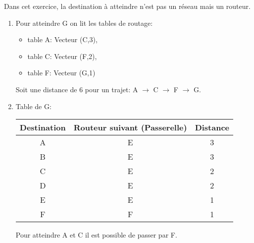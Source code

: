 \documentclass[a4paper,11pt]{article}
\begin{document}
\begin{exo}
    \begin{aretenir}[Remarque]
    Dans cet exercice, la destination à atteindre n'est pas un réseau mais un routeur.
    \end{aretenir}
\begin{enumerate}
    \item Pour atteindre G on lit les tables de routage:
    \begin{itemize}
        \item table A: Vecteur (C,3),
        \item table C: Vecteur (F,2),
        \item table F: Vecteur (G,1)
    \end{itemize}
    Soit une distance de 6 pour un trajet: A $\rightarrow$ C $\rightarrow$ F $\rightarrow$ G.
    \item Table de G:
    \begin{center}
        \begin{tabular}{|*{3}{c|}}
            \hline
            Destination & Routeur suivant (Passerelle) & Distance \\
            \hline
            A & E & 3\\
            \hline
            B & E & 3\\
            \hline
            C & E & 2\\
            \hline
            D & E & 2\\
            \hline
            E & E & 1\\
            \hline
            F & F & 1\\
            \hline
        \end{tabular}
    \end{center}
    \begin{aretenir}[Remarque]
    Pour atteindre A et C il est possible de passer par F.
    \end{aretenir}
\end{enumerate}
\end{exo}
\end{document}
